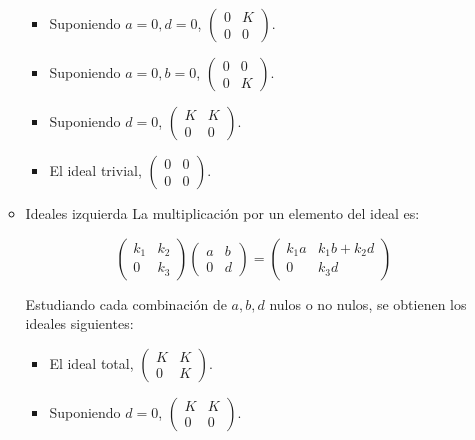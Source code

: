\documentclass[11pt]{article}
\begin{document}
\begin{itemize}
\begin{itemize}
\begin{itemize}
\item Suponiendo $a=0,d=0$, $\begin{pmatrix}0 & K \\ 0 & 0\end{pmatrix}$.

\item Suponiendo $a=0,b=0$, $\begin{pmatrix}0 & 0 \\ 0 & K\end{pmatrix}$.

\item Suponiendo $d=0$, $\begin{pmatrix}K & K \\ 0 & 0\end{pmatrix}$.

\item El ideal trivial, $\begin{pmatrix}0 & 0 \\ 0 & 0\end{pmatrix}$.
\end{itemize}

\item Ideales izquierda
\label{sec-7-4-4-1-2}
La multiplicación por un elemento del ideal es:

\[\begin{pmatrix}
k_1 & k_2 \\ 0 & k_3
\end{pmatrix} \begin{pmatrix}
a & b \\ 0 & d
\end{pmatrix} = \begin{pmatrix}
k_1a & k_1b+k_2d \\ 0 & k_3d
\end{pmatrix}\]

Estudiando cada combinación de $a,b,d$ nulos o no nulos, se obtienen
los ideales siguientes:

\begin{itemize}
\item El ideal total, $\begin{pmatrix}K & K \\ 0 & K\end{pmatrix}$.

\item Suponiendo $d=0$, $\begin{pmatrix}K & K \\ 0 & 0\end{pmatrix}$.


\end{itemize}
\end{itemize}
\end{itemize}
\end{document}
